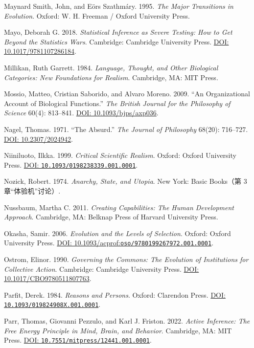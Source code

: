 \documentclass[
  11pt,
  oneside]{book}
\begin{document}
Maynard Smith, John, and Eörs Szathmáry. 1995. \emph{The Major Transitions in Evolution}. Oxford: W. H. Freeman / Oxford University Press.

Mayo, Deborah G. 2018. \emph{Statistical Inference as Severe Testing: How to Get Beyond the Statistics Wars}. Cambridge: Cambridge University Press. \href{https://doi.org/10.1017/9781107286184}{DOI: 10.1017/9781107286184}.

Millikan, Ruth Garrett. 1984. \emph{Language, Thought, and Other Biological Categories: New Foundations for Realism}. Cambridge, MA: MIT Press.

Mossio, Matteo, Cristian Saborido, and Alvaro Moreno. 2009. ``An Organizational Account of Biological Functions.'' \emph{The British Journal for the Philosophy of Science} 60(4): 813--841. \href{https://doi.org/10.1093/bjps/axp036}{DOI: 10.1093/bjps/axp036}.

Nagel, Thomas. 1971. ``The Absurd.'' \emph{The Journal of Philosophy} 68(20): 716--727. \href{https://doi.org/10.2307/2024942}{DOI: 10.2307/2024942}.

Niiniluoto, Ilkka. 1999. \emph{Critical Scientific Realism}. Oxford: Oxford University Press. \href{https://doi.org/10.1093/0198238339.001.0001}{DOI: \nolinkurl{10.1093/0198238339.001.0001}}.

Nozick, Robert. 1974. \emph{Anarchy, State, and Utopia}. New York: Basic Books（第 3 章``体验机''讨论）.

Nussbaum, Martha C. 2011. \emph{Creating Capabilities: The Human Development Approach}. Cambridge, MA: Belknap Press of Harvard University Press.

Okasha, Samir. 2006. \emph{Evolution and the Levels of Selection}. Oxford: Oxford University Press. \href{https://doi.org/10.1093/acprof:oso/9780199267972.001.0001}{DOI: 10.1093/acprof:\nolinkurl{oso/9780199267972.001.0001}}.

Ostrom, Elinor. 1990. \emph{Governing the Commons: The Evolution of Institutions for Collective Action}. Cambridge: Cambridge University Press. \href{https://doi.org/10.1017/CBO9780511807763}{DOI: 10.1017/CBO9780511807763}.

Parfit, Derek. 1984. \emph{Reasons and Persons}. Oxford: Clarendon Press. \href{https://doi.org/10.1093/019824908X.001.0001}{DOI: \nolinkurl{10.1093/019824908X.001.0001}}.

Parr, Thomas, Giovanni Pezzulo, and Karl J. Friston. 2022. \emph{Active Inference: The Free Energy Principle in Mind, Brain, and Behavior}. Cambridge, MA: MIT Press. \href{https://doi.org/10.7551/mitpress/12441.001.0001}{DOI: \nolinkurl{10.7551/mitpress/12441.001.0001}}.
\end{document}

